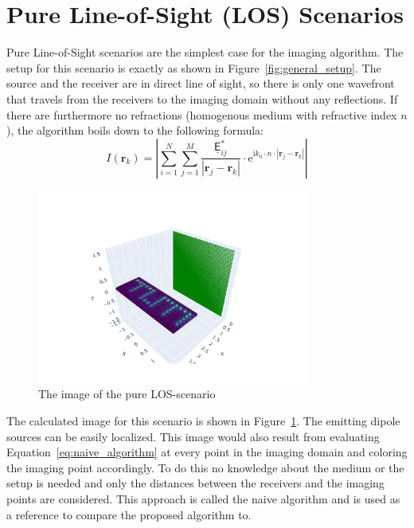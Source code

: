 \section{Pure Line-of-Sight (LOS) Scenarios}
Pure Line-of-Sight scenarios are the simplest case for the imaging algorithm.
The setup for this scenario is exactly as shown in Figure~\ref{fig:general_setup}.
The source and the receiver are in direct line of sight, so there is only one wavefront that travels from the receivers to the imaging domain without any reflections.
If there are furthermore no refractions (homogenous medium with refractive index \(n\)), the algorithm boils down to the following formula:
\begin{equation}\label{eq:naive_algorithm}
    I(\bm{r}_k) = |\sum_{i=1}^{N} \sum_{j=1}^{M} \frac{\underline{\mathsf{E}}_{ij}^*}{|\bm{r}_j - \bm{r}_k|} \cdot \mathrm{e}^{\mathrm{i}k_0\cdot n \cdot |\bm{r}_j - \bm{r}_k|}|
\end{equation}

\begin{figure}[ht]
    \centering
    \includegraphics[width=0.8\textwidth]{figures/los_result.pdf}
    \caption{The image of the pure LOS-scenario}\label{fig:los_results}
\end{figure}

The calculated image for this scenario is shown in Figure~\ref{fig:los_results}.
The emitting dipole sources can be easily localized.
This image would also result from evaluating Equation~\eqref{eq:naive_algorithm} at every point in the imaging domain and coloring the imaging point accordingly.
To do this no knowledge about the medium or the setup is needed and only the distances between the receivers and the imaging points are considered.
This approach is called the naive algorithm and is used as a reference to compare the proposed algorithm to.


